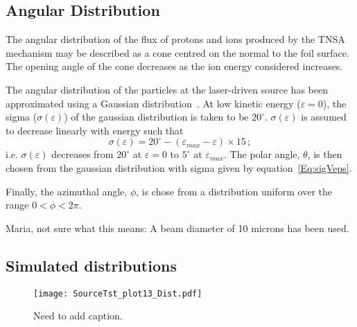 \subsection{Angular Distribution}

The angular distribution of the flux of protons and ions produced by
the TNSA mechanism may be described as a cone centred on the normal to
the foil surface.
The opening angle of the cone decreases as the ion energy considered
increases.

The angular distribution of the particles at the laser-driven source
has been approximated using a Gaussian
distribution~\cite{10.1038/s41598-019-41705-0}.  
At low kinetic energy ($\varepsilon = 0$), the sigma
($\sigma(\varepsilon)$) of the gaussian distribution is taken to be
$20^\circ$.
$\sigma(\varepsilon)$ is assumed to decrease linearly with energy such
that
\begin{equation}
  \sigma(\varepsilon) = 20^\circ - (\varepsilon_{max}
                           - \varepsilon)\times15 \, ;
  \label{Eq:sigVeps}
\end{equation}
i.e. $\sigma(\varepsilon)$ decreases from $20^\circ$ at
$\varepsilon=0$ to $5^\circ$ at $\varepsilon_{max}$.
The polar angle, $\theta$, is then chosen from the gaussian
distribution with sigma given by equation~\ref{Eq:sigVeps}.

Finally, the azimuthal angle, $\phi$, is chose from a distribution
uniform over the range $0 < \phi < 2\pi$.

{\color{red} Maria, not sure what this means: A beam diameter of 10
microns has been used.}

\subsection{Simulated distributions}

\begin{figure}
  \begin{center}
    \texttt{[image: SourceTst\_plot13\_Dist.pdf]}
  \end{center}
  \caption{Need to add caption.}
\end{figure}

